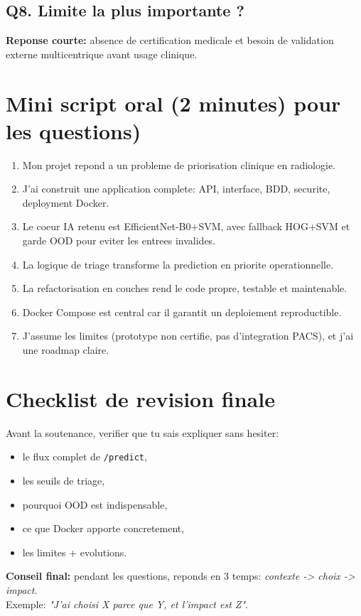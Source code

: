 \documentclass[12pt,a4paper]{article}
\begin{document}
\subsection{Q8. Limite la plus importante ?}
\textbf{Reponse courte:} absence de certification medicale et besoin de validation externe multicentrique avant usage clinique.

\section{Mini script oral (2 minutes) pour les questions)}
\begin{enumerate}
  \item Mon projet repond a un probleme de priorisation clinique en radiologie.
  \item J'ai construit une application complete: API, interface, BDD, securite, deployment Docker.
  \item Le coeur IA retenu est EfficientNet-B0+SVM, avec fallback HOG+SVM et garde OOD pour eviter les entrees invalides.
  \item La logique de triage transforme la prediction en priorite operationnelle.
  \item La refactorisation en couches rend le code propre, testable et maintenable.
  \item Docker Compose est central car il garantit un deploiement reproductible.
  \item J'assume les limites (prototype non certifie, pas d'integration PACS), et j'ai une roadmap claire.
\end{enumerate}

\section{Checklist de revision finale}
Avant la soutenance, verifier que tu sais expliquer sans hesiter:
\begin{itemize}
  \item le flux complet de \texttt{/predict},
  \item les seuils de triage,
  \item pourquoi OOD est indispensable,
  \item ce que Docker apporte concretement,
  \item les limites + evolutions.
\end{itemize}

\vspace{10pt}
\textbf{Conseil final:} pendant les questions, reponds en 3 temps: \textit{contexte -> choix -> impact}.\\
Exemple: \textit{"J'ai choisi X parce que Y, et l'impact est Z"}.
\end{document}
